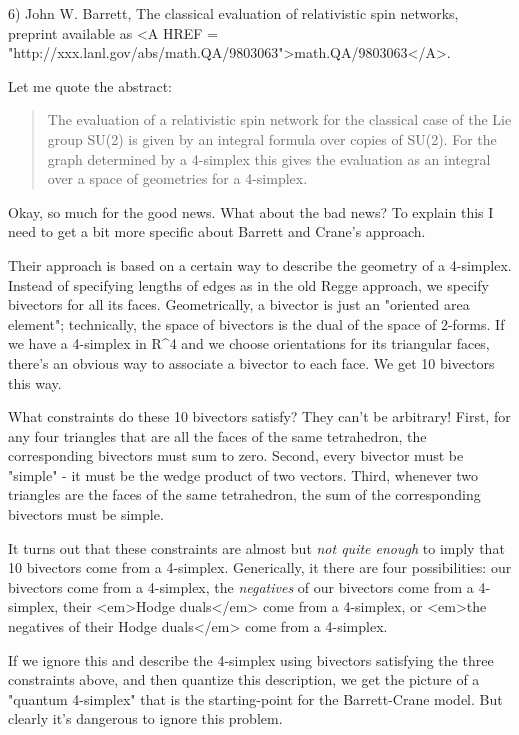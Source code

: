 6) John W. Barrett, The classical evaluation of relativistic spin
networks, preprint available as <A HREF = "http://xxx.lanl.gov/abs/math.QA/9803063">math.QA/9803063</A>.


Let me quote the abstract:

\begin{quote}

     The evaluation of a relativistic spin network for the classical
     case of the Lie group SU(2) is given by an integral formula over
     copies of SU(2).  For the graph determined by a 4-simplex this
     gives the evaluation as an integral over a space of geometries
     for a 4-simplex.

\end{quote}

Okay, so much for the good news.  What about the bad news?  To explain
this I need to get a bit more specific about Barrett
and Crane's approach.  

Their approach is based on a certain way to describe the geometry of a
4-simplex.  Instead of specifying lengths of edges as in the old Regge
approach, we specify bivectors for all its faces.  Geometrically, a
bivector is just an "oriented area element"; technically, the space of
bivectors is the dual of the space of 2-forms.  If we have a 4-simplex
in R^{4} and we choose orientations for its triangular faces, there's an
obvious way to associate a bivector to each face.  We get 10 bivectors
this way.

What constraints do these 10 bivectors satisfy?  They can't be
arbitrary!  First, for any four triangles that are all the faces of
the same tetrahedron, the corresponding bivectors must sum to zero.
Second, every bivector must be "simple" - it must be the wedge
product of two vectors.  Third, whenever two triangles are the faces
of the same tetrahedron, the sum of the corresponding bivectors must
be simple.

It turns out that these constraints are almost but \emph{not quite enough}
to imply that 10 bivectors come from a 4-simplex.  Generically, it
there are four possibilities: our bivectors come from a 4-simplex, 
the \emph{negatives} of our bivectors come from a 4-simplex, their <em>Hodge 
duals</em> come from a 4-simplex, or <em>the negatives of 
their Hodge duals</em> come from a 4-simplex.   

If we ignore this and describe the 4-simplex using bivectors
satisfying the three constraints above, and then quantize this
description, we get the picture of a "quantum 4-simplex" that is the
starting-point for the Barrett-Crane model.  But clearly it's
dangerous to ignore this problem.

